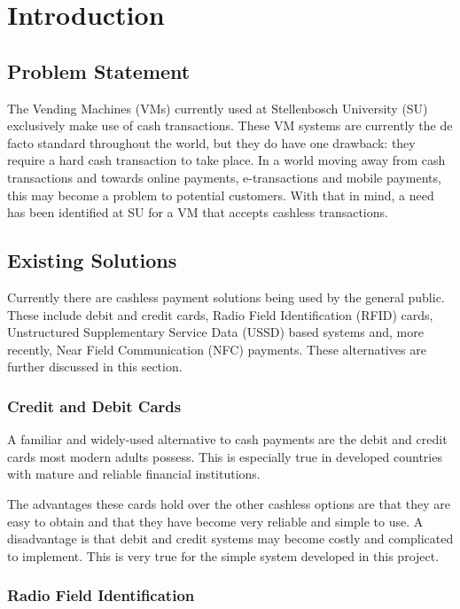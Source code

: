 \chapter{Introduction}
\label{chap:1}

\section{Problem Statement}

The Vending Machines (VMs) currently used at Stellenbosch University (SU) exclusively
make use of cash transactions. These VM systems are currently the
de facto standard throughout the world, but they do have one drawback:
they require a hard cash transaction to take place. In a world moving away from
cash transactions and towards online payments, e-transactions and mobile
payments, this may become a problem to potential customers. With that in mind, a need has
been identified at SU for a VM that accepts cashless transactions.

\section{Existing Solutions}

Currently there are cashless payment solutions being used by the general public.
These include debit and credit cards, Radio Field Identification (RFID) cards,
Unstructured Supplementary Service Data (USSD) based systems and, more recently, Near
Field Communication (NFC) payments. These alternatives are further discussed in this
section.

\subsection{Credit and Debit Cards}

A familiar and widely-used alternative to cash payments are the debit and
credit cards most modern adults possess. This is especially
true in developed countries with mature and reliable financial institutions.

The advantages these cards hold over the other cashless options are
that they are easy to obtain and that they have become very
reliable and simple to use. A disadvantage is that debit and credit systems may become
costly and complicated to implement. This is very true for the simple system developed in
this project.

\subsection{Radio Field Identification}

